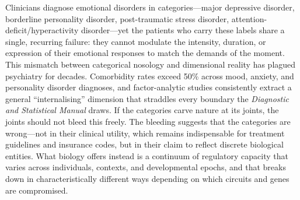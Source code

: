 


Clinicians diagnose emotional disorders in categories---major depressive
disorder, borderline personality disorder, post-traumatic stress disorder,
attention-deficit/hyperactivity disorder---yet the patients who carry these
labels share a single, recurring failure: they cannot modulate the intensity,
duration, or expression of their emotional responses to match the demands of
the moment.  This mismatch between categorical nosology and dimensional
reality has plagued psychiatry for decades.  Comorbidity rates exceed 50\%
across mood, anxiety, and personality disorder diagnoses, and factor-analytic
studies consistently extract a general ``internalising'' dimension that
straddles every boundary the \emph{Diagnostic and Statistical Manual}
draws.  If the categories carve nature at its joints, the joints
should not bleed this freely.  The bleeding suggests that the categories are
wrong---not in their clinical utility, which remains indispensable for
treatment guidelines and insurance codes, but in their claim to reflect
discrete biological entities.  What biology offers instead is a continuum of
regulatory capacity that varies across individuals, contexts, and
developmental epochs, and that breaks down in characteristically different
ways depending on which circuits and genes are compromised.

